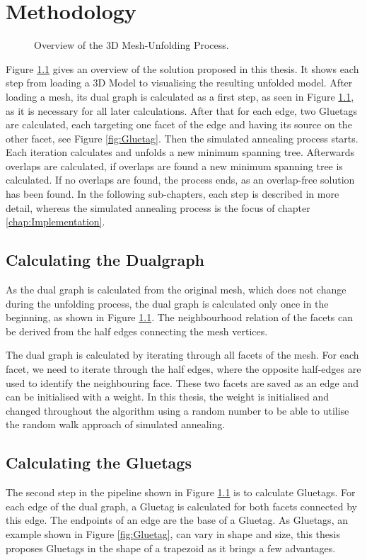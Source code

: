 \documentclass[draft,final]{vutinfth} %
\begin{document}
\chapter{Methodology}
\label{chap:methodology}

\begin{figure}

\caption{Overview of the 3D Mesh-Unfolding Process.}
\label{fig:overview}
\end{figure}

Figure \ref{fig:overview} gives an overview of the solution proposed in this thesis. It shows each step from loading a 3D Model to visualising the resulting unfolded model. After loading a mesh, its dual graph is calculated as a first step, as seen in Figure \ref{fig:overview}, as it is necessary for all later calculations. After that for each edge, two Gluetags are calculated, each targeting one facet of the edge and having its source on the other facet, see Figure \ref{fig:Gluetag}. Then the simulated annealing process starts. Each iteration calculates and unfolds a new minimum spanning tree. Afterwards overlaps are calculated, if overlaps are found a new minimum spanning tree is calculated. If no overlaps are found, the process ends, as an overlap-free solution has been found. In the following sub-chapters, each step is described in more detail, whereas the simulated annealing process is the focus of chapter \ref{chap:Implementation}.

\section{Calculating the Dualgraph}
\label{sec:calcdual}
As the dual graph is calculated from the original mesh, which does not change during the unfolding process, the dual graph is calculated only once in the beginning, as shown in Figure \ref{fig:overview}. The neighbourhood relation of the facets can be derived from the half edges connecting the mesh vertices. 

The dual graph is calculated by iterating through all facets of the mesh. For each facet, we need to iterate through the half edges, where the opposite half-edges are used to identify the neighbouring face. These two facets are saved as an edge and can be initialised with a weight. In this thesis, the weight is initialised and changed throughout the algorithm using a random number to be able to utilise the random walk approach of simulated annealing.

\section{Calculating the Gluetags}
\label{sec:calcgluetag}
The second step in the pipeline shown in Figure \ref{fig:overview} is to calculate Gluetags. For each edge of the dual graph, a Gluetag is calculated for both facets connected by this edge. The endpoints of an edge are the base of a Gluetag. As Gluetags, an example shown in Figure \ref{fig:Gluetag}, can vary in shape and size, this thesis proposes Gluetags in the shape of a trapezoid as it brings a few advantages. 
\end{document}

